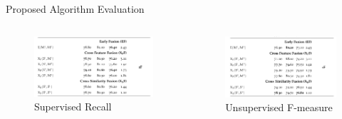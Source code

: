 \documentclass[10pt,xcolor=table]{beamer}
\begin{document}
\begin{frame}{Proposed Algorithm Evaluation}
\begin{columns}
	\begin{minipage}[c][0.5\textheight][c]{\linewidth}
	\begin{figure}
		\centering
		\includegraphics[width=1\linewidth]{image2/Chapitre4/wsd_PA_SR}
		\caption{Supervised Recall}
	\end{figure}

	\end{minipage}
	\begin{minipage}[c][0.5\textheight][c]{\linewidth}
	\begin{figure}
		\centering
		\includegraphics[width=1\linewidth]{image2/Chapitre4/wsd_PA_UF.png}
		\caption{Unsupervised F-measure}
	\end{figure}
	\end{minipage}
	\end{columns}
\end{frame}
\end{document}
